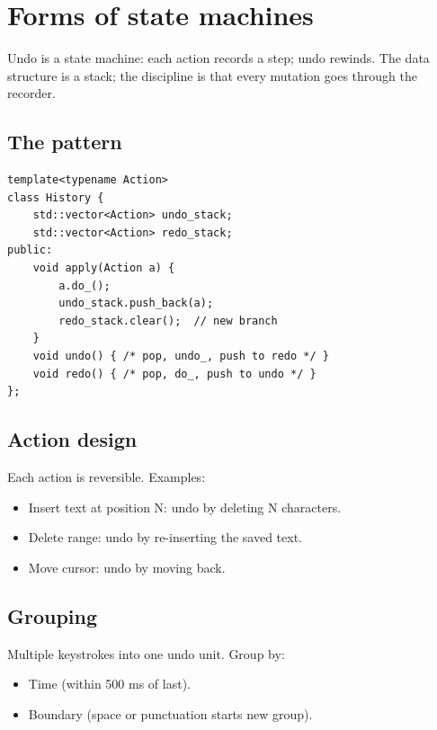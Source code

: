 \chapter{Forms of state machines}
\label{ch:undostate}

\begin{aside}
Undo is a state machine: each action records a step; undo
rewinds. The data structure is a stack; the discipline is
that every mutation goes through the recorder.
\end{aside}

\section{The pattern}

\begin{lstlisting}
template<typename Action>
class History {
    std::vector<Action> undo_stack;
    std::vector<Action> redo_stack;
public:
    void apply(Action a) {
        a.do_();
        undo_stack.push_back(a);
        redo_stack.clear();  // new branch
    }
    void undo() { /* pop, undo_, push to redo */ }
    void redo() { /* pop, do_, push to undo */ }
};
\end{lstlisting}

\section{Action design}

Each action is reversible. Examples:

\begin{itemize}[leftmargin=*]
  \item Insert text at position N: undo by deleting N
    characters.
  \item Delete range: undo by re-inserting the saved text.
  \item Move cursor: undo by moving back.
\end{itemize}

\section{Grouping}

Multiple keystrokes into one undo unit. Group by:

\begin{itemize}[leftmargin=*]
  \item Time (within 500 ms of last).
  \item Boundary (space or punctuation starts new group).
\end{itemize}


